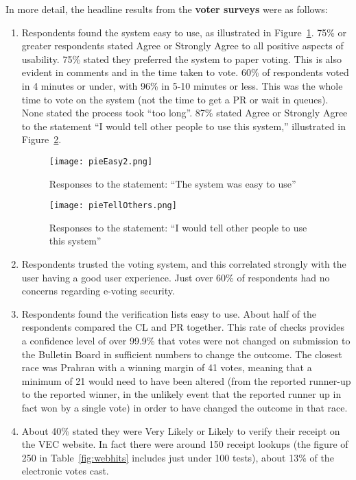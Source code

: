 \documentclass[twocolumn]{article}
\begin{document}
In more detail, the headline results from the {\bf voter surveys} were as follows:
\begin{enumerate}
\item	Respondents found the system easy to use, as illustrated in Figure~\ref{fig:easy}.   75\% or greater respondents stated Agree or Strongly Agree to all positive aspects of usability.  75\% stated they preferred the system to paper voting.  This is also evident in comments and in the time taken to vote.  60\% of respondents voted in 4 minutes or under, with 96\% in 5-10 minutes or less.  This was the whole time to vote on the system (not the time to get a PR or wait in queues).  None stated the process took ``too long''.  87\% stated Agree or Strongly Agree to the statement ``I would tell other people to use this system,'' illustrated in Figure~\ref{fig:tellothers}.
\begin{figure}
\begin{center}
\texttt{[image: pieEasy2.png]}
\end{center}
\caption{Responses to the statement: ``The system was easy to use''} 
\label{fig:easy}
\end{figure}
\begin{figure}
\begin{center}
\texttt{[image: pieTellOthers.png]}
\end{center}
\caption{Responses to the statement: ``I would tell other people to use this system''} 
\label{fig:tellothers}
\end{figure}
\item Respondents trusted the voting system, and this correlated strongly with the user having a good user experience.  Just over 60\% of respondents had no concerns regarding e-voting security.
\item Respondents found the verification lists easy to use.  About half of the respondents compared the CL and PR together.
This rate of checks provides a confidence level of over 99.9\% that votes were not changed on submission to the Bulletin Board in sufficient numbers to change the outcome.  The closest race was Prahran with a winning margin of 41 votes, meaning that a minimum of 21 would need to have been altered (from the reported runner-up to the reported winner, in the unlikely event that the reported runner up in fact won by a single vote) in order to have changed the outcome in that race.   
\item  About 40\% stated they were Very Likely or Likely to verify their receipt on the VEC website.  In fact there were around 150 receipt lookups (the figure of 250 in Table~\ref{fig:webhits} includes just under 100 tests), about 13\% of the electronic votes cast.   

\end{enumerate}
\end{document}
